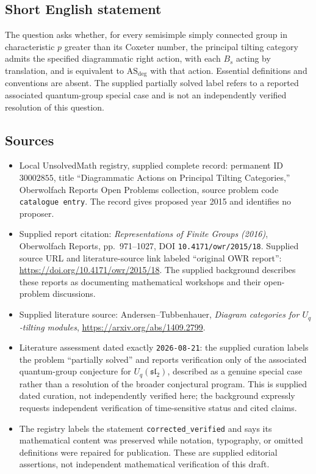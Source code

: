 \documentclass[11pt]{article}
\begin{document}
\subsection{Short English statement}
The question asks whether, for every semisimple simply connected group in characteristic \(p\) greater than its Coxeter number, the principal tilting category admits the specified diagrammatic right action, with each \(B_s\) acting by translation, and is equivalent to \(\mathrm{AS}_{\mathrm{deg}}\) with that action. Essential definitions and conventions are absent. The supplied partially solved label refers to a reported associated quantum-group special case and is not an independently verified resolution of this question.
\subsection{Sources}
\begin{itemize}
\item Local UnsolvedMath registry, supplied complete record: permanent ID \(30002855\), title ``Diagrammatic Actions on Principal Tilting Categories,'' Oberwolfach Reports Open Problems collection, source problem code \texttt{catalogue entry}. The record gives proposed year 2015 and identifies no proposer.
\item Supplied report citation: \emph{Representations of Finite Groups (2016)}, Oberwolfach Reports, pp.~971--1027, DOI \texttt{10.4171/owr/2015/18}. Supplied source URL and literature-source link labeled ``original OWR report'': \url{https://doi.org/10.4171/owr/2015/18}. The supplied background describes these reports as documenting mathematical workshops and their open-problem discussions.
\item Supplied literature source: Andersen--Tubbenhauer, \emph{Diagram categories for \(U_q\)-tilting modules}, \url{https://arxiv.org/abs/1409.2799}.
\item Literature assessment dated exactly \texttt{2026-08-21}: the supplied curation labels the problem ``partially solved'' and reports verification only of the associated quantum-group conjecture for \(U_q(\mathfrak{sl}_2)\), described as a genuine special case rather than a resolution of the broader conjectural program. This is supplied dated curation, not independently verified here; the background expressly requests independent verification of time-sensitive status and cited claims.
\item The registry labels the statement \texttt{corrected\_verified} and says its mathematical content was preserved while notation, typography, or omitted definitions were repaired for publication. These are supplied editorial assertions, not independent mathematical verification of this draft.
\end{itemize}
\end{document}
